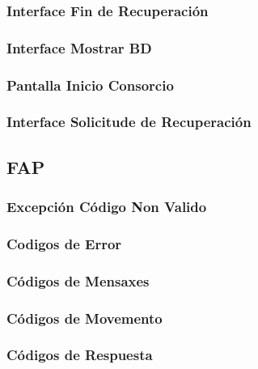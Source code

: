 \documentclass[a4paper,titlepage]{article}
\begin{document}
\subsubsection{Interface Fin de Recuperación}

\subsubsection{Interface Mostrar BD}

\subsubsection{Pantalla Inicio Consorcio}

\subsubsection{Interface Solicitude de Recuperación}


\subsection{FAP}

\subsubsection{Excepción Código Non Valido}

\subsubsection{Codigos de Error}

\subsubsection{Códigos de Mensaxes}

\subsubsection{Códigos de Movemento}

\subsubsection{Códigos de Respuesta}

\end{document}
